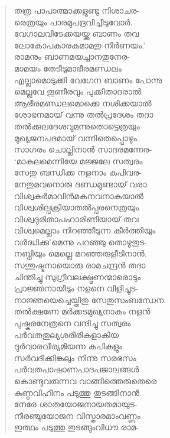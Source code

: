 \begin{verse}
തത്ര പാപാത്മാക്കളുണ്ടു നിശാചര-\\
രെത്രയും പാരമുപദ്രവിച്ചീടുവോര്‍.\\
വേഗാലവിടേക്കയയ്ക്ക ബാണം തവ\\
ലോകോപകാരകമാമതു നിര്‍ണയം.’\\
രാമനും ബാണമയച്ചാനതുനേര-\\
മാമയം തേടീടുമാഭീരമണ്ഡലം\\
എല്ലാമൊടുക്കി വേഗേന ബാണം പോന്നു\\
മെല്ലവേ തൂണീരവും പുക്കിതാദരാല്‍\\
ആഭീരമണ്ഡലമൊക്കെ നശിക്കയാല്‍\\
ശോഭനമായ് വന്നു തല്‍പ്രദേശം തദാ\\
തല്‍ക്കുലദേശവുമന്നുതൊട്ടെത്രയും\\
മുഖ്യജനപദമായ് വന്നിതെപ്പൊഴും.\\
സാഗരം ചൊല്ലിനാന്‍ സാദരമന്നേര-\\
‘മാകുലമെന്നിയേ മജ്ജലേ സത്വരം\\
സേതു ബന്ധിക്ക നളനാം കപിവര-\\
നേതുമവനൊരു ദണ്ഡമുണ്ടായ് വരാ.\\
വിശ്വകര്‍മാവിന്‍മകനവനാകയാല്‍\\
വിശ്വശില്പക്രിയാതല്‍പ്പരനെത്രയും\\
വിശ്വദുരിതാപഹാരിണിയായ് തവ\\
വിശ്വമെല്ലാം നിറഞ്ഞീടുന്ന കീര്‍ത്തിയും\\
വര്‍ദ്ധിക്കു’മെന്നു പറഞ്ഞു തൊഴുതുട-\\
നബ്ധിയും മെല്ലെ മറഞ്ഞരുളീടിനാന്‍.\\
സന്തുഷ്ടനായൊരു രാമചന്ദ്രന്‍ തദാ\\
ചിന്തിച്ചു സുഗ്രീവലക്ഷ്മണന്മാരൊടും\\
പ്രാജ്ഞനായീടും നളനെ വിളിച്ചുട-\\
നാജ്ഞയെച്ചെയ്തിതു സേതുസംബന്ധേന.\\
തല്‍ക്ഷണേ മര്‍ക്കടമുഖ്യനാകും നളന്‍\\
പുഷ്കരനേത്രനെ വന്ദിച്ചു സത്വരം\\
പര്‍വതതുല്യശരീരികളാകിയ\\
ദുര്‍വാരവീര്യമിയന്ന കപികളും\\
സര്‍വദിക്കിങ്കലും നിന്നു സരഭസം\\
പര്‍വതപാഷാണപാദപജാലങ്ങള്‍\\
കൊണ്ടുവരുന്നവ വാങ്ങിത്തെരുതെരെ\\
കുണ്ഠവിഹീനം പടുത്തു തുടങ്ങിനാന്‍.\\
നേരേ ശാതയോജനായതമായുട-\\
നീരഞ്ചുയോജന വിസ്താരമാംവണ്ണം\\
ഇത്ഥം പടുത്തു തുടങ്ങുംവിധൗ രാമ-\\

\end{verse}
